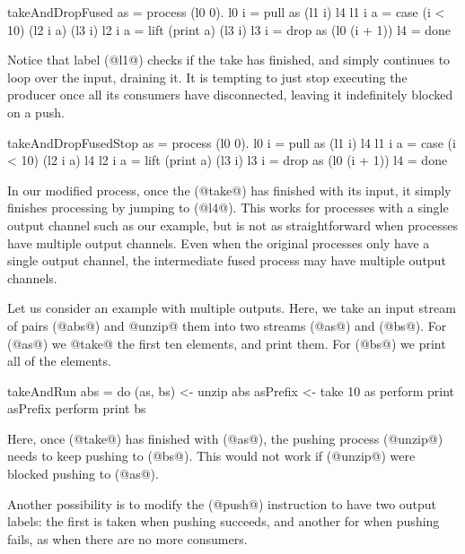 \begin{code}
takeAndDropFused as = process (l0 0).
 l0 i   = pull as (l1 i) l4
 l1 i a = case (i < 10) (l2 i a) (l3 i)
 l2 i a = lift (print a) (l3 i)
 l3 i   = drop as (l0 (i + 1))
 l4     = done
\end{code} 

Notice that label (@l1@) checks if the take has finished, and simply continues to loop over the input, draining it.
It is tempting to just stop executing the producer once all its consumers have disconnected, leaving it indefinitely blocked on a push.

\begin{code}
takeAndDropFusedStop as = process (l0 0).
 l0 i   = pull as (l1 i) l4
 l1 i a = case (i < 10) (l2 i a) l4
 l2 i a = lift (print a) (l3 i)
 l3 i   = drop as (l0 (i + 1))
 l4     = done
\end{code} 

In our modified process, once the (@take@) has finished with its input, it simply finishes processing by jumping to (@l4@).
This works for processes with a single output channel such as our example, but is not as straightforward when processes have multiple output channels.
Even when the original processes only have a single output channel, the intermediate fused process may have multiple output channels.

Let us consider an example with multiple outputs. Here, we take an input stream of pairs (@abs@) and @unzip@ them into two streams (@as@) and (@bs@).
For (@as@) we @take@ the first ten elements, and print them.
For (@bs@) we print all of the elements.

\begin{code}
takeAndRun abs = do
  (as, bs) <- unzip abs
  asPrefix <- take 10 as
  perform print asPrefix
  perform print bs
\end{code}

Here, once (@take@) has finished with (@as@), the pushing process (@unzip@) needs to keep pushing to (@bs@).
This would not work if (@unzip@) were blocked pushing to (@as@).

Another possibility is to modify the (@push@) instruction to have two output labels: the first is taken when pushing succeeds, and another for when pushing fails, as when there are no more consumers.


